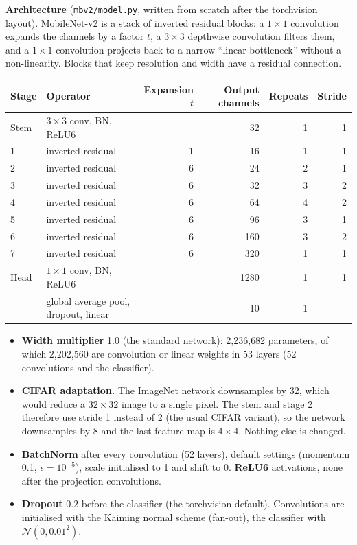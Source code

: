 \documentclass[11pt,a4paper]{article}
\begin{document}
\textbf{Architecture} (\texttt{mbv2/model.py}, written from scratch after the torchvision layout). MobileNet-v2 is a stack of inverted residual blocks: a $1\times1$ convolution expands the channels by a factor $t$, a $3\times3$ depthwise convolution filters them, and a $1\times1$ convolution projects back to a narrow ``linear bottleneck'' without a non-linearity. Blocks that keep resolution and width have a residual connection.

\begin{center}
\small
\begin{tabular}{llrrrr}
\toprule
Stage & Operator & Expansion $t$ & Output channels & Repeats & Stride \\
\midrule
Stem & $3\times3$ conv, BN, ReLU6 & & 32 & 1 & 1 \\
1 & inverted residual & 1 & 16 & 1 & 1 \\
2 & inverted residual & 6 & 24 & 2 & 1 \\
3 & inverted residual & 6 & 32 & 3 & 2 \\
4 & inverted residual & 6 & 64 & 4 & 2 \\
5 & inverted residual & 6 & 96 & 3 & 1 \\
6 & inverted residual & 6 & 160 & 3 & 2 \\
7 & inverted residual & 6 & 320 & 1 & 1 \\
Head & $1\times1$ conv, BN, ReLU6 & & 1280 & 1 & 1 \\
     & global average pool, dropout, linear & & 10 & 1 & \\
\bottomrule
\end{tabular}
\end{center}

\begin{itemize}
\item \textbf{Width multiplier} 1.0 (the standard network): 2{,}236{,}682 parameters, of which 2{,}202{,}560 are convolution or linear weights in 53 layers (52 convolutions and the classifier).
\item \textbf{CIFAR adaptation.} The ImageNet network downsamples by 32, which would reduce a $32\times32$ image to a single pixel. The stem and stage 2 therefore use stride 1 instead of 2 (the usual CIFAR variant), so the network downsamples by 8 and the last feature map is $4\times4$. Nothing else is changed.
\item \textbf{BatchNorm} after every convolution (52 layers), default settings (momentum 0.1, $\epsilon=10^{-5}$), scale initialised to 1 and shift to 0. \textbf{ReLU6} activations, none after the projection convolutions.
\item \textbf{Dropout} 0.2 before the classifier (the torchvision default). Convolutions are initialised with the Kaiming normal scheme (fan-out), the classifier with $\mathcal N(0, 0.01^2)$.
\end{itemize}
\end{document}
